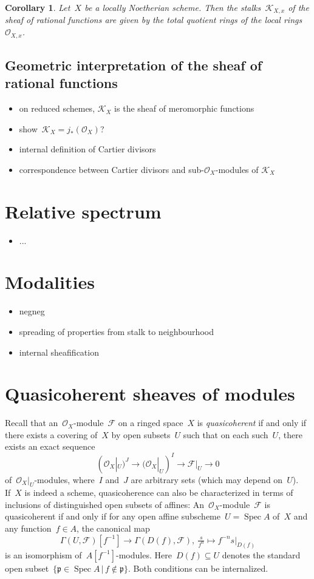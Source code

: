 \documentclass[10pt]{amsart}
\theoremstyle{definition}
\theoremstyle{plain}
\newtheorem{cor}[defn]{Corollary}
\theoremstyle{remark}
\newcommand{\F}{\mathcal{F}}
\renewcommand{\O}{\mathcal{O}}
\newcommand{\K}{\mathcal{K}}
\newcommand{\ppp}{\mathfrak{p}}
\DeclareMathOperator{\Spec}{Spec}
\newcommand{\?}{\,{:}\,}
\renewcommand{\_}{\mathpunct{.}\,}
\begin{document}
\begin{cor}Let~$X$ be a locally Noetherian scheme. Then the stalks~$\K_{X,x}$
of the sheaf of rational functions are given by the total quotient rings of the
local rings~$\O_{X,x}$.\end{cor}


\subsection{Geometric interpretation of the sheaf of rational functions}

\begin{itemize}
\item on reduced schemes, $\K_X$ is the sheaf of meromorphic functions
\item show~$\K_X = j_*(\O_X)$?
\item internal definition of Cartier divisors
\item correspondence between Cartier divisors and sub-$\O_X$-modules of $\K_X$
\end{itemize}


\section{Relative spectrum}
\begin{itemize}
\item ...
\end{itemize}

\section{Modalities}
\begin{itemize}
\item negneg
\item spreading of properties from stalk to neighbourhood
\item internal sheafification
\end{itemize}


\section{Quasicoherent sheaves of modules}

Recall that an~$\O_X$-module~$\F$ on a ringed space~$X$ is \emph{quasicoherent}
if and only if there exists a covering of~$X$ by open subsets~$U$ such that on
each such~$U$, there exists an exact sequence
\[ (\O_X|_U)^J \longrightarrow (\O_X|_U)^I \longrightarrow \F|_U \longrightarrow 0 \]
of~$\O_X|_U$-modules, where~$I$ and~$J$ are arbitrary sets (which may depend
on~$U$). If~$X$ is indeed a scheme, quasicoherence can also be characterized in
terms of inclusions of distinguished open subsets of affines:
An~$\O_X$-module~$\F$ is quasicoherent if and only if for any open affine
subscheme~$U = \Spec A$ of~$X$ and any function~$f \in A$, the canonical map
\[ \Gamma(U,\F)[f^{-1}] \longrightarrow \Gamma(D(f),\F),\ 
  \tfrac{s}{f^n} \longmapsto f^{-n} s|_{D(f)} \]
is an isomorphism of~$A[f^{-1}]$-modules. Here~$D(f) \subseteq U$ denotes the
standard open subset~$\{ \ppp \in \Spec A \,|\, f \not\in \ppp \}$. Both
conditions can be internalized.
\end{document}
